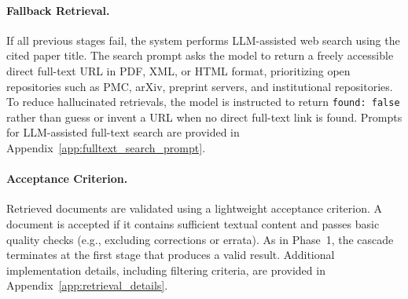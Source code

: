\documentclass{article}
\theoremstyle{plain}
\theoremstyle{definition}
\theoremstyle{remark}
\begin{document}
\paragraph{Fallback Retrieval.}
If all previous stages fail, the system performs LLM-assisted web search using the cited paper title. The search prompt asks the model to return a freely accessible direct full-text URL in PDF, XML, or HTML format, prioritizing open repositories such as PMC, arXiv, preprint servers, and institutional repositories. To reduce hallucinated retrievals, the model is instructed to return \texttt{found: false} rather than guess or invent a URL when no direct full-text link is found. Prompts for LLM-assisted full-text search are provided in Appendix~\ref{app:fulltext_search_prompt}.

\paragraph{Acceptance Criterion.}
Retrieved documents are validated using a lightweight acceptance criterion. A document is accepted if it contains sufficient textual content and passes basic quality checks (e.g., excluding corrections or errata). As in Phase~1, the cascade terminates at the first stage that produces a valid result. Additional implementation details, including filtering criteria, are provided in Appendix~\ref{app:retrieval_details}.




\end{document}
